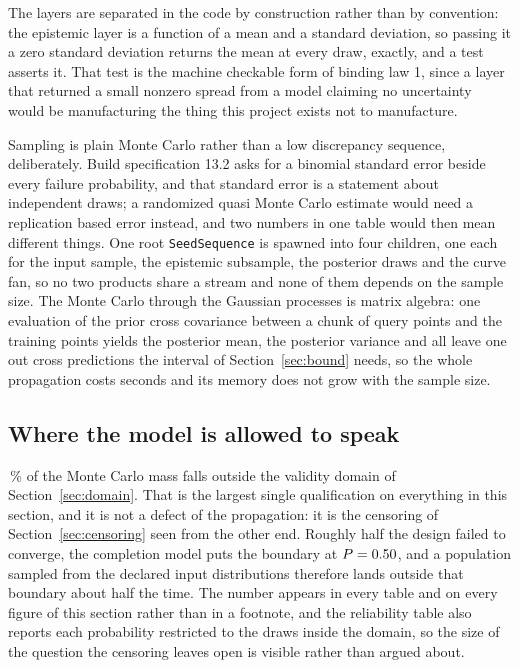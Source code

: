 \documentclass[11pt,a4paper]{article}
\begin{document}
The layers are separated in the code by construction rather than by convention: the epistemic
layer is a function of a mean and a standard deviation, so passing it a zero standard deviation
returns the mean at every draw, exactly, and a test asserts it. That test is the machine
checkable form of binding law 1, since a layer that returned a small nonzero spread from a model
claiming no uncertainty would be manufacturing the thing this project exists not to manufacture.

Sampling is plain Monte Carlo rather than a low discrepancy sequence, deliberately. Build
specification 13.2 asks for a binomial standard error beside every failure probability, and that
standard error is a statement about independent draws; a randomized quasi Monte Carlo estimate
would need a replication based error instead, and two numbers in one table would then mean
different things. One root \texttt{SeedSequence} is spawned into four children, one each for the
input sample, the epistemic subsample, the posterior draws and the curve fan, so no two products
share a stream and none of them depends on the sample size. The Monte Carlo through the Gaussian
processes is matrix algebra: one evaluation of the prior cross covariance between a chunk of
query points and the \NValid{} training points yields the posterior mean, the posterior variance
and all \NValid{} leave one out cross predictions the interval of Section~\ref{sec:bound} needs,
so the whole propagation costs seconds and its memory does not grow with the sample size.

\subsection{Where the model is allowed to speak}
\label{sec:domainmass}
\OutOfDomainPct\,\% of the Monte Carlo mass falls outside the validity domain of
Section~\ref{sec:domain}. That is the largest single qualification on everything in this
section, and it is not a defect of the propagation: it is the censoring of Section~\ref{sec:censoring}
seen from the other end. Roughly half the design failed to converge, the completion model puts
the boundary at $P = 0.50{}$, and a population sampled from the declared input
distributions therefore lands outside that boundary about half the time. The number appears in
every table and on every figure of this section rather than in a footnote, and the reliability
table also reports each probability restricted to the draws inside the domain, so the size of
the question the censoring leaves open is visible rather than argued about.
\end{document}
